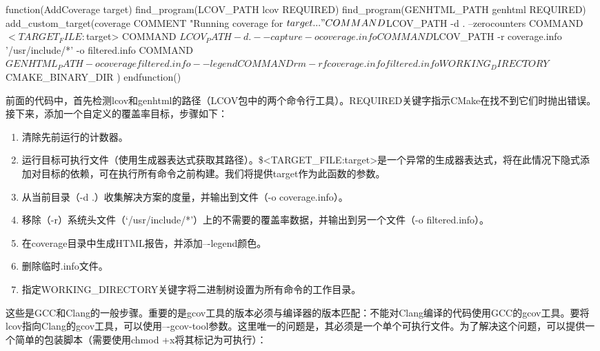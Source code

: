 
\begin{cmake}
function(AddCoverage target)
    find_program(LCOV_PATH lcov REQUIRED)
    find_program(GENHTML_PATH genhtml REQUIRED)
    add_custom_target(coverage
        COMMENT "Running coverage for ${target}..."
        COMMAND ${LCOV_PATH} -d . --zerocounters
        COMMAND $<TARGET_FILE:${target}>
        COMMAND ${LCOV_PATH} -d . --capture -o coverage.info
        COMMAND ${LCOV_PATH} -r coverage.info '/usr/include/*'
                             -o filtered.info
        COMMAND ${GENHTML_PATH} -o coverage filtered.info
            --legend
        COMMAND rm -rf coverage.info filtered.info
        WORKING_DIRECTORY ${CMAKE_BINARY_DIR}
    )
endfunction()
\end{cmake}

前面的代码中，首先检测lcov和genhtml的路径（LCOV包中的两个命令行工具）。REQUIRED关键字指示CMake在找不到它们时抛出错误。接下来，添加一个自定义的覆盖率目标，步骤如下：

\begin{enumerate}
\item
清除先前运行的计数器。

\item
运行目标可执行文件（使用生成器表达式获取其路径）。\$<TARGET\_FILE:target>是一个异常的生成器表达式，将在此情况下隐式添加对目标的依赖，可在执行所有命令之前构建。我们将提供target作为此函数的参数。

\item
从当前目录（-d .）收集解决方案的度量，并输出到文件（-o coverage.info）。

\item
移除（-r）系统头文件（‘/usr/include/*’）上的不需要的覆盖率数据，并输出到另一个文件（-o filtered.info）。

\item
在coverage目录中生成HTML报告，并添加–{}-legend颜色。

\item
删除临时.info文件。

\item
指定WORKING\_DIRECTORY关键字将二进制树设置为所有命令的工作目录。
\end{enumerate}

这些是GCC和Clang的一般步骤。重要的是gcov工具的版本必须与编译器的版本匹配：不能对Clang编译的代码使用GCC的gcov工具。要将lcov指向Clang的gcov工具，可以使用–{}-gcov-tool参数。这里唯一的问题是，其必须是一个单个可执行文件。为了解决这个问题，可以提供一个简单的包装脚本（需要使用chmod +x将其标记为可执行）：

